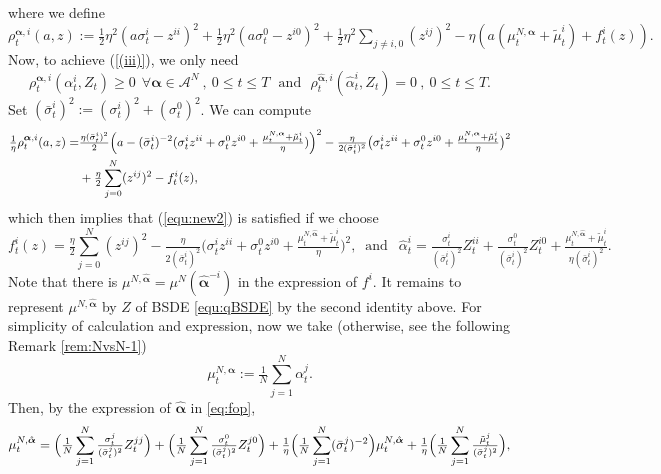 \documentclass[10pt,a4paper]{article}
\newcommand{\be}{\begin{equation}}
\newcommand{\ee}{\end{equation}}
\newcommand{\Balpha}{\boldsymbol{\alpha}}
\newcommand{\hBalpha}{\hat{\Balpha}}
\theoremstyle{plain}
\theoremstyle{definition}
\numberwithin{equation}{section}
\begin{document}
where we define
$
\rho_{t}^{\Balpha, i}(a,z) := \tfrac{1}{2}\eta^{2}(a\sigma_{t}^{i}-z^{ii})^{2} + \tfrac{1}{2}\eta^{2}(a\sigma_{t}^{0}-z^{i0})^{2} + \tfrac{1}{2}\eta^{2}\sum_{j \neq i,0}(z^{ij})^{2} - \eta(a(\mu_{t}^{N,\Balpha}+\tilde{\mu}_{t}^{i})+f_{t}^{i}(z)).
$
Now, to achieve (\ref{(iii)}), we only need
\begin{equation}
\label{equ:new2}
\rho_{t}^{\Balpha, i}(\alpha^{i}_{t},Z_{t}) \geq 0  \ \ \forall \Balpha  \in \mathcal{A}^N \ , \ 0 \leq t \leq T \ \ \ \text{and} \ \ \ \rho_{t}^{\hBalpha, i}(\hat{\alpha}^{i}_{t},Z_{t}) = 0 \ , \ 0 \leq t \leq T.
\end{equation}
Set $(\bar{\sigma}_{t}^{i})^{2} := (\sigma_{t}^{i})^{2} + (\sigma_{t}^{0})^{2}$. We can compute
\begin{align*}
\tfrac{1}{\eta}\rho_{t}^{\Balpha, i}(a,z) = & \tfrac{\eta (\bar{\sigma}_{t}^{i})^{2}}{2}\Bigl(a - (\bar{\sigma}_{t}^{i})^{-2}(\sigma_{t}^{i}z^{ii} + \sigma_{t}^{0}z^{i0} + \tfrac{\mu_{t}^{N,\Balpha}+\tilde{\mu}_{t}^{i}}{\eta})\Bigr)^{2} - \tfrac{\eta}{2(\bar{\sigma}_{t}^{i})^{2}}\bigl(\sigma_{t}^{i}z^{ii} + \sigma_{t}^{0}z^{i0} + \tfrac{\mu_{t}^{N,\Balpha}+\tilde{\mu}_{t}^{i}}{\eta}\bigr)^{2}\\
&+ \tfrac{\eta}{2}\sum_{j=0}^{N}(z^{ij})^{2} - f_{t}^{i}(z),    
\end{align*}
which then implies that (\ref{equ:new2}) is satisfied if we choose
\be\label{eq:fop}
f_{t}^{i}(z) = \tfrac{\eta}{2}\sum_{j=0}^{N}(z^{ij})^{2} - \tfrac{\eta}{2(\bar{\sigma}_{t}^{i})^{2}}\bigl(\sigma_{t}^{i}z^{ii} + \sigma_{t}^{0}z^{i0} + \tfrac{\mu_{t}^{N,\hBalpha}+\tilde{\mu}_{t}^{i}}{\eta}\bigr)^{2}, 
 \  \text{ and } \ \ 
 \hat{\alpha}_{t}^{i} = \tfrac{\sigma_{t}^{i}}{(\bar{\sigma}_{t}^{i})^{2}}Z_{t}^{ii} + \tfrac{\sigma_{t}^{0}}{(\bar{\sigma}_{t}^{i})^{2}}Z_{t}^{i0} + \tfrac{\mu_{t}^{N,\hBalpha}+\tilde{\mu}_{t}^{i}}{\eta(\bar{\sigma}_{t}^{i})^{2}}.
\ee
Note that there is $\mu^{N,\hBalpha}=\mu^N(\hBalpha^{-i})$ in the expression of $f^i$. It remains to represent $\mu^{N,\hBalpha}$ by $Z$ of BSDE \eqref{equ:qBSDE} by the second identity above. For simplicity of calculation and expression, now we take (otherwise, see the following Remark \ref{rem:NvsN-1})
\begin{equation}
\label{equ:DefMu}
\mu_{t}^{N,\Balpha}:= \tfrac{1}{N}\sum_{j=1}^{N}\alpha_{t}^{j}.
\end{equation}
Then, by the expression of $\hBalpha$ in \eqref{eq:fop}, 
\[
\mu_{t}^{N,\hat{\Balpha}}  = \Bigl(\tfrac{1}{N}\sum_{j=1}^{N}\tfrac{\sigma_{t}^{j}}{(\bar{\sigma}_{t}^{j})^{2}}Z_{t}^{jj}\Bigr) + \Bigl(\tfrac{1}{N}\sum_{j=1}^{N}\tfrac{\sigma_{t}^{0}}{(\bar{\sigma}_{t}^{j})^{2}}Z_{t}^{j0}\Bigr) + \tfrac{1}{\eta}\Bigl(\tfrac{1}{N}\sum_{j=1}^{N}(\bar{\sigma}_{t}^{j})^{-2}\Bigr)\mu_{t}^{N,\hat{\Balpha}} + \tfrac{1}{\eta}\Bigl(\tfrac{1}{N}\sum_{j=1}^{N}\tfrac{\tilde{\mu}_{t}^{j}}{(\bar{\sigma}_{t}^{j})^{2}}\Bigr),
\]
\end{document}
